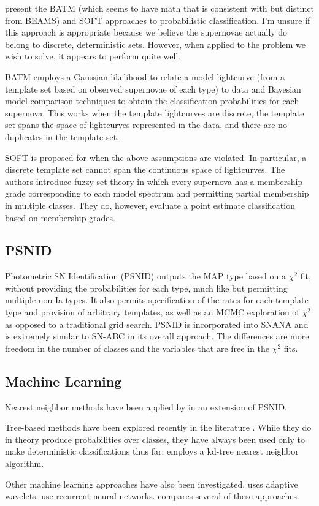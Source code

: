 \documentclass[12pt, onecolumn]{emulateapj}
\begin{document}
\citet{Rodney09, Rodney10} present the BATM (which seems to have math that is consistent with but distinct from BEAMS) and SOFT approaches to probabilistic classification.  I'm unsure if this approach is appropriate because we believe the supernovae actually do belong to discrete, deterministic sets.  However, when applied to the problem we wish to solve, it appears to perform quite well.

BATM employs a Gaussian likelihood to relate a model lightcurve (from a template set based on observed supernovae of each type) to data and Bayesian model comparison techniques to obtain the classification probabilities for each supernova.  This works when the template lightcurves are discrete, the template set spans the space of lightcurves represented in the data, and there are no duplicates in the template set.  

SOFT is proposed for when the above assumptions are violated.  In particular, a discrete template set cannot span the continuous space of lightcurves.  The authors introduce fuzzy set theory in which every supernova has a membership grade corresponding to each model spectrum and permitting partial membership in multiple classes.  They do, however, evaluate a point estimate classification based on membership grades.

\subsection{PSNID}

Photometric SN Identification (PSNID) \citep{Sako11} outputs the MAP type based on a $\chi^{2}$ fit, without providing the probabilities for each type, much like \citet{Poznanski06} but permitting multiple non-Ia types.  It also permits specification of the rates for each template type and provision of arbitrary templates, as well as an MCMC exploration of $\chi^{2}$ as opposed to a traditional grid search.  PSNID is incorporated into SNANA and is extremely similar to SN-ABC in its overall approach.  The differences are more freedom in the number of classes and the variables that are free in the $\chi^{2}$ fits.

\subsection{Machine Learning}

Nearest neighbor methods have been applied by \citet{Sako14} in an extension of PSNID.

Tree-based methods have been explored recently in the literature \citep{Richards11, Sako14, Lochner16, Moller16}.  While they do in theory produce probabilities over classes, they have always been used only to make deterministic classifications thus far.  \citet{Sako14} employs a kd-tree nearest neighbor algorithm.

Other machine learning approaches have also been investigated.  \citet{Varughese15} uses adaptive wavelets.  \citet{Karpenka12, Charnock16} use recurrent neural networks.  \citet{Lochner16} compares several of these approaches.




\end{document}
